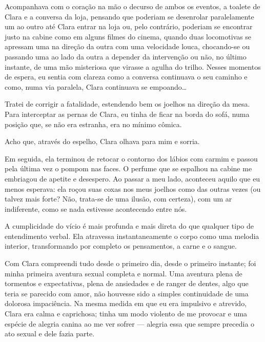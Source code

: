 Acompanhava com o coração na mão o decurso de ambos os eventos, a toalete de Clara e a conversa da loja, pensando que poderiam se desenrolar paralelamente um ao outro até Clara entrar na loja ou, pelo contrário, poderiam se encontrar justo na cabine como em alguns filmes do cinema, quando duas locomotivas se apressam uma na direção da outra com uma velocidade louca, chocando-se ou passando uma ao lado da outra a depender da intervenção ou não, no último instante, de uma mão misteriosa que virasse a agulha do trilho. Nesses momentos de espera, eu sentia com clareza como a conversa continuava o seu caminho e como, numa via paralela, Clara continuava se empoando\dots

Tratei de corrigir a fatalidade, estendendo bem os joelhos na direção da mesa. Para interceptar as pernas de Clara, eu tinha de ficar na borda do sofá, numa posição que, se não era estranha, era no mínimo cômica.

Acho que, através do espelho, Clara olhava para mim e sorria.

Em seguida, ela terminou de retocar o contorno dos lábios com carmim e passou pela última vez o pompom nas faces. O perfume que se espalhou na cabine me embriagou de apetite e desespero. Ao passar a meu lado, aconteceu aquilo que eu menos esperava: ela roçou suas coxas nos meus joelhos como das outras vezes (ou talvez mais forte? Não, trata-se de uma ilusão, com certeza), com um ar indiferente, como se nada estivesse acontecendo entre nós.

A cumplicidade do vício é mais profunda e mais direta do que qualquer tipo de entendimento verbal. Ela atravessa instantaneamente o corpo como uma melodia interior, transformando por completo os pensamentos, a carne e o sangue.


Com Clara compreendi tudo desde o primeiro dia, desde o primeiro instante; foi minha primeira aventura sexual completa e normal. Uma aventura plena de tormentos e expectativas, plena de ansiedades e de ranger de dentes, algo que teria se parecido com amor, não houvesse sido a simples continuidade de uma dolorosa impaciência. Na mesma medida em que eu era impulsivo e atrevido, Clara era calma e caprichosa; tinha um modo violento de me provocar e uma espécie de alegria canina ao me ver sofrer --- alegria essa que sempre precedia o ato sexual e dele fazia parte.

